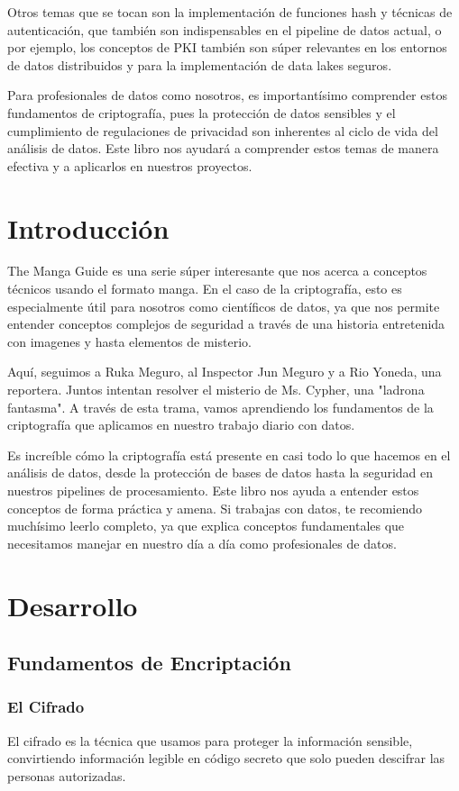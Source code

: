 \documentclass{article}
\begin{document}
Otros temas que se tocan son la implementación de funciones hash y técnicas de autenticación, 
que también son indispensables en el pipeline de datos actual, o por ejemplo, los conceptos de PKI también son súper 
relevantes en los entornos de datos distribuidos y para la implementación de data lakes seguros.

Para profesionales de datos como nosotros, es importantísimo comprender estos fundamentos de criptografía,
pues la protección de datos sensibles y el cumplimiento de regulaciones de privacidad son inherentes al ciclo de vida del
análisis de datos. Este libro nos ayudará a comprender estos temas de manera efectiva y a aplicarlos en nuestros proyectos.


\section{Introducción}
The Manga Guide es una serie súper interesante que nos acerca a conceptos técnicos usando el formato manga. En el caso 
de la criptografía, esto es especialmente útil para nosotros como científicos de datos, ya que nos permite entender 
conceptos complejos de seguridad a través de una historia entretenida con imagenes y hasta elementos de misterio.

Aquí, seguimos a Ruka Meguro, al Inspector Jun Meguro y a Rio Yoneda, una reportera. Juntos intentan resolver el misterio
de Ms. Cypher, una "ladrona fantasma". A través de esta trama, vamos aprendiendo los fundamentos de la criptografía que 
aplicamos en nuestro trabajo diario con datos.

Es increíble cómo la criptografía está presente en casi todo lo que hacemos en el análisis de datos, desde la 
protección de bases de datos hasta la seguridad en nuestros pipelines de procesamiento. Este libro nos ayuda a 
entender estos conceptos de forma práctica y amena. Si trabajas con datos, te recomiendo muchísimo leerlo completo, 
ya que explica conceptos fundamentales que necesitamos manejar en nuestro día a día como profesionales de datos.

\section{Desarrollo}
    \subsection{Fundamentos de Encriptación}
        \subsubsection{El Cifrado}
            El cifrado es la técnica que usamos para proteger la información sensible, convirtiendo 
        información legible en código secreto que solo pueden descifrar las personas autorizadas.
        
\end{document}
